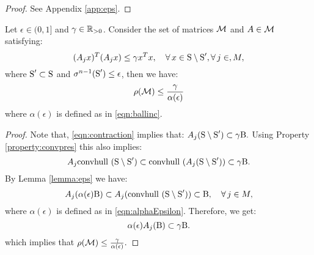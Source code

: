 \begin{proof}See Appendix \ref{app:eps}.
\end{proof}

\begin{lemma}\label{lemma:epsilon1}Let $\epsilon \in (0, 1]$ and $\gamma \in \mathbb{R}_{> 0}$. Consider the set of matrices $\mathcal{M}$ and $A \in \mathcal{M}$ satisfying:
\begin{equation}\label{eqn:contraction}(A_jx)^T(A_jx) \leq \gamma x^Tx, \quad \forall\, x \in \text{S} \setminus \text{S}', \forall\,j \in, M,\end{equation}
where $\text{S}' \subset \text{S}$ and $\sigma^{n-1}(\text{S}') \leq \epsilon$, then we have:
\begin{equation*}
\rho(\mathcal{M}) \leq \frac{\gamma}{\alpha(\epsilon)}
\end{equation*}
where $\alpha(\epsilon)$ is defined as in \eqref{eqn:ballinc}.
\end{lemma}

\begin{proof}Note that, \eqref{eqn:contraction} implies that:
$A_j (\text{S} \setminus \text{S}') \subset \gamma \text{B}.$
Using Property \ref{property:convpres} this also implies:
$$A_j \mbox{convhull }(\text{S} \setminus \text{S}') \subset \mbox{convhull }(A_j(\text{S} \setminus \text{S}')) \subset \gamma \text{B} .$$
By Lemma \ref{lemma:eps} we have:
$$A_j (\alpha(\epsilon) \text{B}) \subset A_j (\mbox{convhull } (\text{S} \setminus \text{S}')) \subset \text{B}, \quad  \forall\, j \in M,$$
where $\alpha(\epsilon)$ is defined as in \eqref{eqn:alphaEpsilon}. Therefore, we get:
$$\alpha(\epsilon) A_j (\text{B}) \subset \gamma\text{B}.$$
which implies that $\rho(\mathcal{M}) \leq \frac{\gamma}{\alpha(\epsilon)}.$
\end{proof}




